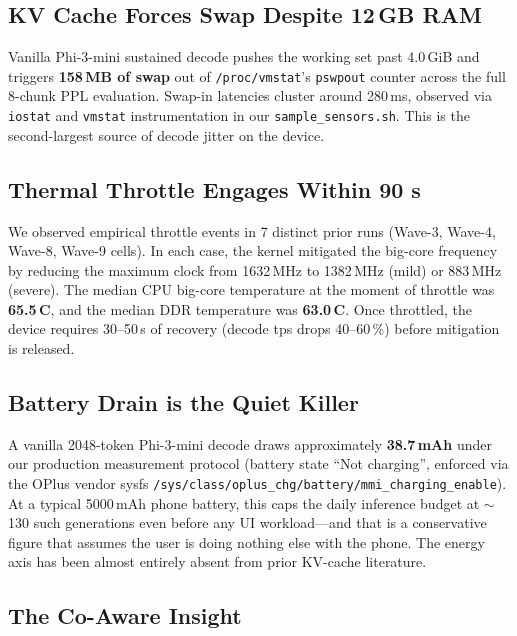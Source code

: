 \documentclass[sigconf, anonymous=false, screen=true]{acmart}
\newcommand{\bad}[1]{\textcolor{endurkvred}{\textbf{#1}}}
\begin{document}
\subsection{KV Cache Forces Swap Despite 12\,GB RAM}

Vanilla Phi-3-mini sustained decode pushes the working set past 4.0\,GiB and triggers \bad{158\,MB of swap} out of \texttt{/proc/vmstat}'s \texttt{pswpout} counter across the full 8-chunk PPL evaluation. Swap-in latencies cluster around 280\,ms, observed via \texttt{iostat} and \texttt{vmstat} instrumentation in our \texttt{sample\_sensors.sh}. This is the second-largest source of decode jitter on the device.

\subsection{Thermal Throttle Engages Within 90 s}

We observed empirical throttle events in 7 distinct prior runs (Wave-3, Wave-4, Wave-8, Wave-9 cells). In each case, the kernel mitigated the big-core frequency by reducing the maximum clock from 1632\,MHz to 1382\,MHz (mild) or 883\,MHz (severe). The median CPU big-core temperature at the moment of throttle was \textbf{65.5\,\textdegree C}, and the median DDR temperature was \textbf{63.0\,\textdegree C}. Once throttled, the device requires 30--50\,s of recovery (decode tps drops 40--60\,\%) before mitigation is released.

\subsection{Battery Drain is the Quiet Killer}

A vanilla 2048-token Phi-3-mini decode draws approximately \textbf{38.7\,mAh} under our production measurement protocol (battery state ``Not charging'', enforced via the OPlus vendor sysfs \texttt{/sys/class/oplus\_chg/battery/mmi\_charging\_enable}). At a typical 5000\,mAh phone battery, this caps the daily inference budget at $\sim$130 such generations even before any UI workload---and that is a conservative figure that assumes the user is doing nothing else with the phone. The energy axis has been almost entirely absent from prior KV-cache literature.

\subsection{The Co-Aware Insight}
\end{document}
